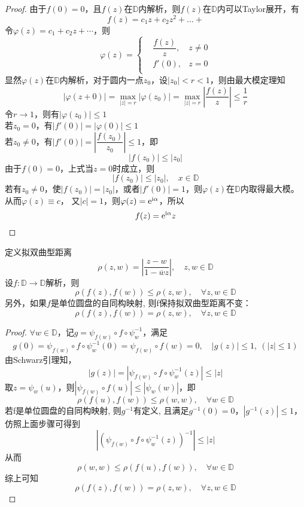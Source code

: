 \begin{proof}
    
        
    由于$f(0) = 0$，且$f(z)$在$\mathbb{D}$内解析，则$f(z)$在$\mathbb{D}$内可以\textup{Taylor}展开，有
    $$f(z) = c_1 z + c_2 z^2 + \dots + $$
    令$\varphi(z) =  c_1 + c_2 z + \cdots $，则
    $$
    \varphi(z) = 
    \left\{
        \begin{aligned}
            & \dfrac{f(z)}{z}, & z \neq 0 \\
            &f'(0), & z = 0 \\
        \end{aligned}
    \right.
    $$
    显然$\varphi(z)$在$\mathbb{D}$内解析，对于圆内一点$z_0$，设$|z_0| < r < 1$，则由最大模定理知
    $$|\varphi(z + 0)| = \max_{|z| = r}|\varphi(z_0)| = \max_{|z| = r}{\left| \dfrac{f(z)}{z} \right|} \leq \dfrac{1}{r}$$
    令$r \to 1$，则有$|\varphi(z_0)| \leq 1$ \\
    若$z_0 = 0$，有$|f'(0)| = |\varphi(0)| \leq 1$ \\
    若$z_0 \neq 0$，有$|f'(0)| = \left| \dfrac{f(z_0)}{z_0} \right| \leq 1$，即
    $$|f(z_0)| \leq |z_0|$$
    由于$f(0) = 0$，上式当$z = 0$时成立，则
    $$|f(z_0)| \leq |z_0|, \quad x \in \mathbb{D}$$
    若有$z_0 \neq 0$，使$|f(z_0)| = |z_0| $，或者$|f'(0)| = 1$，则$\varphi(z)$在$\mathbb{D}$内取得最大模。\\
    从而$\varphi(z) \equiv c$， 又$|c| = 1$，则$\varphi(z) = \mathrm{e}^{\mathrm{i}\alpha}$，所以
    $$f(z) = \mathrm{e}^{\mathrm{i}\alpha}z$$

\end{proof}

\begin{theorem}[拟双曲型距离]

    定义拟双曲型距离
    $$\rho(z, w) = \left| \dfrac{z - w}{1 - \overline{w}z} \right|, \quad z, w \in \mathbb{D}$$
    设$f: \mathbb{D} \to \mathbb{D}$解析，则
    $$\rho(f(z), f(w)) \leq \rho(z, w), \quad \forall z, w \in \mathbb{D}$$
    另外，如果$f$是单位圆盘的自同构映射, 则f保持拟双曲型距离不变：
    $$\rho(f(z), f(w)) = \rho(z, w), \quad \forall z, w \in \mathbb{D}$$
    
\end{theorem}

\begin{proof}

    $\forall w \in \mathbb{D}$，记$g = \psi_{f(w)} \circ f \circ \psi^{-1}_{w}$，满足
    $$g(0) = \psi_{f(w)} \circ f \circ \psi^{-1}_{w}(0) = \psi_{f(w)} \circ f(w) = 0, \quad |g(z)| \leq 1,\ (|z| \leq 1)$$
    由\textup{Schwarz}引理知，
    $$|g(z)| = |\psi_{f(w)} \circ f \circ \psi^{-1}_{w}(z)| \leq |z|$$
    取$z = \psi_{w}(u)$，则$|\psi_{f(w)} \circ f(u)| \leq |\psi_{w}(w)|$，即
    $$\rho(f(u), f(w)) \leq \rho(w, w), \quad \forall w \in \mathbb{D}$$
    若f是单位圆盘的自同构映射, 则$g^{-1}$有定义, 且满足$g^{-1}(0) = 0$，$|g^{-1}(z)| \leq 1$，仿照上面步骤可得到
    $$|(\psi_{f(w)} \circ f \circ \psi^{-1}_{w}(z))^{-1}| \leq |z|$$
    从而
    $$\rho(w, w) \leq \rho(f(u), f(w)), \quad \forall w \in \mathbb{D}$$
    综上可知
    $$\rho(f(z), f(w)) = \rho(z, w), \quad \forall z, w \in \mathbb{D}$$

\end{proof}

